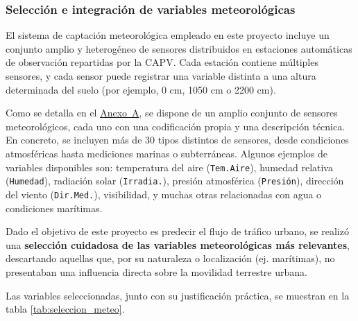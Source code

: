 \subsubsection{Selección e integración de variables meteorológicas}

El sistema de captación meteorológica empleado en este proyecto incluye un conjunto amplio y heterogéneo de sensores distribuidos en estaciones automáticas de observación repartidas por la CAPV. Cada estación contiene múltiples sensores, y cada sensor puede registrar una variable distinta a una altura determinada del suelo (por ejemplo, 0 cm, 1050 cm o 2200 cm). 

Como se detalla en el \hyperref[anexo:sensores]{Anexo~A}, se dispone de un amplio conjunto de sensores meteorológicos, cada uno con una codificación propia y una descripción técnica. En concreto, se incluyen más de 30 tipos distintos de sensores, desde condiciones atmosféricas hasta mediciones marinas o subterráneas. Algunos ejemplos de variables disponibles son: temperatura del aire (\texttt{Tem.Aire}), humedad relativa (\texttt{Humedad}), radiación solar (\texttt{Irradia.}), presión atmosférica (\texttt{Presión}), dirección del viento (\texttt{Dir.Med.}), visibilidad, y muchas otras relacionadas con agua o condiciones marítimas. 

Dado el objetivo de este proyecto es predecir el flujo de tráfico urbano, se realizó una \textbf{selección cuidadosa de las variables meteorológicas más relevantes}, descartando aquellas que, por su naturaleza o localización (ej. marítimas), no presentaban una influencia directa sobre la movilidad terrestre urbana.

Las variables seleccionadas, junto con su justificación práctica, se muestran en la tabla \ref{tab:seleccion_meteo}.


